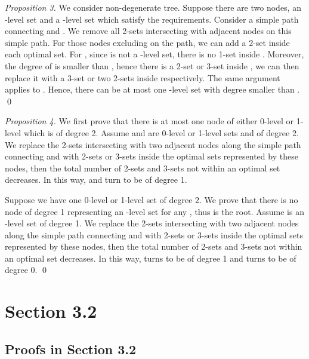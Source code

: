 \documentclass[runningheads,a4paper]{llncs}
\numberwithin{equation}{section}
\begin{document}
\begin{proof}[Proposition 3]
We consider non-degenerate tree. Suppose there are two nodes, an -level set  and a -level set  which satisfy the requirements. Consider a simple path connecting  and . We remove all 2-sets intersecting with adjacent nodes on this simple path. For those nodes excluding  on the path, we can add a 2-set inside each optimal set. For , since  is not a -level set, there is no 1-set inside . Moreover, the degree of  is smaller than , hence there is a 2-set or 3-set inside , we can then replace it with a 3-set or two 2-sets inside  respectively. The same argument applies to . Hence, there can be at most one -level set with degree smaller than . \qed
\end{proof}

\begin{proof}[Proposition 4]
We first prove that there is at most one node of either 0-level or 1-level which is of degree 2. Assume  and  are 0-level or 1-level sets and of degree 2. We replace the 2-sets intersecting with two adjacent nodes along the simple path connecting  and  with 2-sets or 3-sets inside the optimal sets represented by these nodes, then the total number of 2-sets and 3-sets not within an optimal set decreases. In this way,  and  turn to be of degree 1.

Suppose we have one 0-level or 1-level set  of degree 2. We prove that there is no node of degree 1 representing an -level set for any , thus  is the root. Assume  is an -level set of degree 1. We replace the 2-sets intersecting with two adjacent nodes along the simple path connecting  and  with 2-sets or 3-sets inside the optimal sets represented by these nodes, then the total number of 2-sets and 3-sets not within an optimal set decreases. In this way,  turns to be of degree 1 and  turns to be of degree 0. \qed
\end{proof}


\section{Section 3.2}

\subsection{Proofs in Section 3.2}
\end{document}
